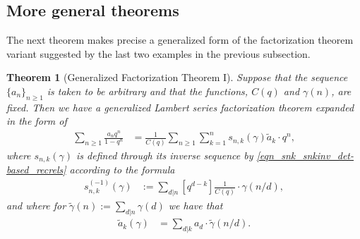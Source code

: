 \documentclass[10pt,reqno]{amsart}
\numberwithin{figure}{section}
\numberwithin{table}{section}
\theoremstyle{plain}
\newtheorem{theorem}{Theorem}
\numberwithin{theorem}{section}
\theoremstyle{remark}
\begin{document}
\subsection{More general theorems} 

The next theorem makes precise a generalized form of the factorization theorem variant 
suggested by the last two examples in the previous subsection. 

\begin{theorem}[Generalized Factorization Theorem I] 
\label{theorem_GenLSFactThm_vI} 
Suppose that the sequence $\{a_n\}_{n \geq 1}$ is taken to be arbitrary and that the functions, 
$C(q)$ and $\gamma(n)$, are fixed. Then we have a generalized Lambert series factorization 
theorem expanded in the form of 
\begin{align*} 
\sum_{n \geq 1} \frac{a_n q^n}{1-q^n} & = \frac{1}{C(q)} \sum_{n \geq 1} \sum_{k=1}^n 
     s_{n,k}(\gamma) \widetilde{a}_k \cdot q^n, 
\end{align*} 
where $s_{n,k}(\gamma)$ is defined through its inverse sequence by \eqref{eqn_snk_snkinv_det-based_recrels}
according to the formula 
\begin{align*} 
s_{n,k}^{(-1)}(\gamma) & := \sum_{d|n} [q^{d-k}] \frac{1}{C(q)} \cdot \gamma(n/d), 
\end{align*} 
and where for $\widetilde{\gamma}(n) := \sum_{d|n} \gamma(d)$ we have that 
\begin{align*} 
\widetilde{a}_k(\gamma) & = \sum_{d|k} a_d \cdot \widetilde{\gamma}(n/d). 
\end{align*} 
\end{theorem} 
\end{document}

